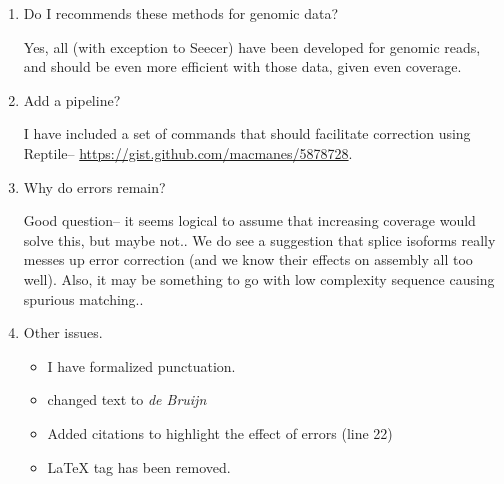 \documentclass[11pt]{article}
\begin{document}
\begin{enumerate}
\item Do I recommends these methods for genomic data? 
\begin{addmargin}[2em]{2em}
Yes, all (with exception to Seecer) have been developed for genomic reads, and should be even more efficient with those data, given even coverage.
\end{addmargin}

\item Add a pipeline? 
\begin{addmargin}[2em]{2em}
I have included a set of commands that should facilitate correction using Reptile-- \url{https://gist.github.com/macmanes/5878728}. 
\end{addmargin}

\item Why do errors remain? 
\begin{addmargin}[2em]{2em}
Good question-- it seems logical to assume that increasing coverage would solve this, but maybe not.. We do see a suggestion that splice isoforms really messes up error correction (and we know their effects on assembly all too well).  Also, it may be something to go with low complexity sequence causing spurious matching.. 
\end{addmargin}

\item Other issues. 
\begin{addmargin}[2em]{2em}
\begin{itemize}
\item I have formalized punctuation.
\item changed text to \textit{de Bruijn} 
\item Added citations to highlight the effect of errors (line 22)
\item LaTeX tag has been removed.


\end{itemize}
\end{addmargin}

\end{enumerate}
\end{document}
